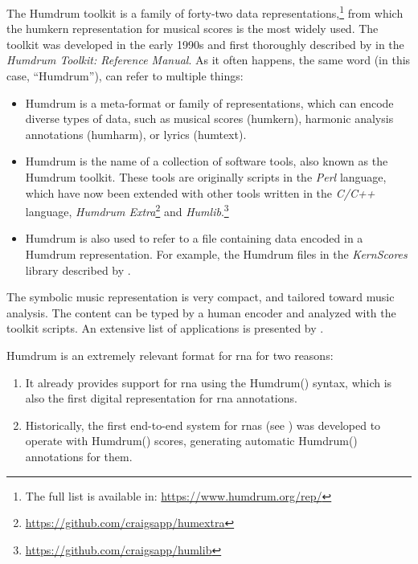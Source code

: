 


The Humdrum toolkit is a family of forty-two data
representations,\footnote{The full list is available in:
\href{https://www.humdrum.org/rep/}{https://www.humdrum.org/rep/}}
from which the \gls{humkern} representation for musical
scores is the most widely used. The toolkit was developed in
the early 1990s and first thoroughly described by
\textcite{huron1994humdrum} in the \emph{Humdrum Toolkit:
Reference Manual}. As it often happens, the same word (in
this case, ``Humdrum''), can refer to multiple things:

\begin{itemize}
    \item Humdrum is a meta-format or family of
    representations, which can encode diverse types of data,
    such as musical scores (\gls{humkern}), harmonic
    analysis annotations (\gls{humharm}), or lyrics
    (\gls{humtext}).
    \item Humdrum is the name of a collection of software
    tools, also known as the Humdrum toolkit. These tools
    are originally scripts in the \emph{Perl} language,
    which have now been extended with other tools written in
    the \emph{C/C++} language, \emph{Humdrum
    Extra}\footnote{\href{https://github.com/craigsapp/humextra}{https://github.com/craigsapp/humextra}}
    and
    \emph{Humlib}.\footnote{\href{https://github.com/craigsapp/humlib}{https://github.com/craigsapp/humlib}}
    \item Humdrum is also used to refer to a file containing
    data encoded in a Humdrum representation. For example,
    the Humdrum files in the \emph{KernScores} library
    described by \textcite{sapp2005online}.
\end{itemize}


The  symbolic music representation is very
compact, and tailored toward music analysis. The content can
be typed by a human encoder and analyzed with the toolkit
scripts. An extensive list of applications is presented by
\textcite{sapp2011computational}.


Humdrum is an extremely relevant format for \gls{rna} for
two reasons:

\begin{enumerate}
    \item It already provides support for \gls{rna} using
    the Humdrum() syntax, which is also the
    first digital representation for \gls{rna} annotations.
    \item Historically, the first end-to-end system for
    \glspl{rna} (see
    ) was developed
    to operate with Humdrum() scores,
    generating automatic Humdrum() annotations
    for them.
\end{enumerate}
